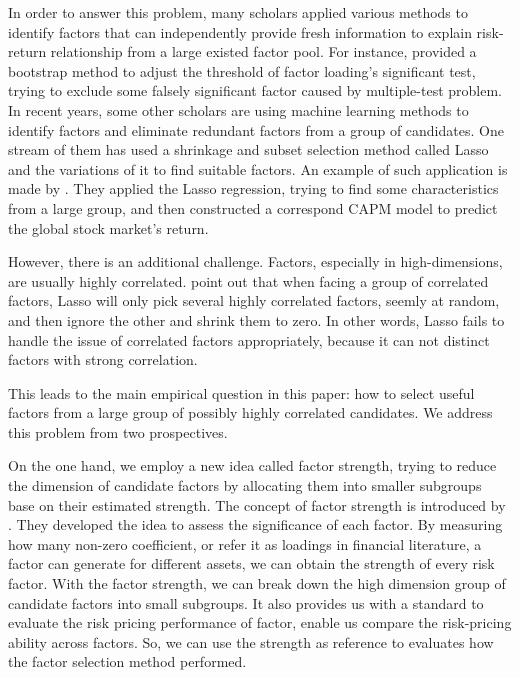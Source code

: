 In order to answer this problem, many scholars applied various methods to identify factors that can independently provide fresh information to explain risk-return relationship from a large existed factor pool.
For instance,  provided a bootstrap method to adjust the threshold of factor loading's significant test, trying to exclude some falsely significant factor caused by multiple-test problem.
In recent years, some other scholars are using machine learning methods to identify factors and eliminate redundant factors from a group of candidates.
One stream of them has used a shrinkage and subset selection method called Lasso \cite{Tibshirani1996} and the variations of it to find suitable factors.
An example of such application is made by .
They applied the Lasso regression, trying to find some characteristics from a large group, and then constructed a correspond CAPM model to predict the global stock market's return.

However, there is an additional challenge.
Factors, especially in high-dimensions, are usually highly correlated.
 point out that when facing a group of correlated factors, Lasso will only pick several highly correlated factors, seemly at random, and then ignore the other and shrink them to zero. 
In other words, Lasso fails to handle the issue of correlated factors appropriately, because it can not distinct factors with strong correlation.

This leads to the main empirical question in this paper: how to select useful factors from a large group of possibly highly correlated candidates.
We address this problem from two prospectives.

On the one hand, we employ a new idea called factor strength, trying to reduce the dimension of candidate factors by allocating them into smaller subgroups base on their estimated strength.
The concept of factor strength is introduced by .
They developed the idea to assess the significance of each factor.
By measuring how many non-zero coefficient, or refer it as loadings in financial literature, a factor can generate for different assets, we can obtain the strength of every risk factor.
With the factor strength, we can break down the high dimension group of candidate factors into small subgroups.
It also provides us with a standard to evaluate the risk pricing performance of factor, enable us compare the risk-pricing ability across factors.
So, we can use the strength as reference to evaluates how the factor selection method performed.

